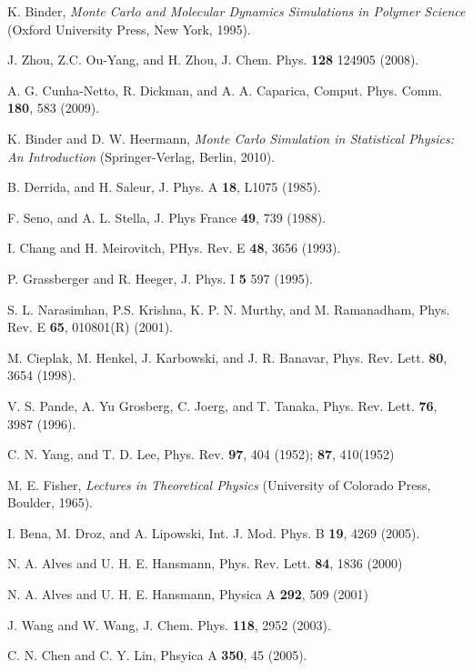 \documentclass[preprint,preprintnumbers,amsmath,amssymb,showpacs,aps,pre]{revtex4-1}
\begin{document}
\begin{thebibliography}{10}
K. Binder, {\it Monte Carlo and Molecular Dynamics Simulations in
Polymer Science} (Oxford University Press, New York, 1995).

J. Zhou, Z.C. Ou-Yang, and H. Zhou, J. Chem. Phys. {\bf 128}
124905 (2008).

A. G. Cunha-Netto, R. Dickman, and A. A. Caparica, Comput. Phys. Comm.
{\bf 180}, 583 (2009).

K. Binder and D. W. Heermann, {\it Monte Carlo Simulation in
Statistical Physics: An Introduction} (Springer-Verlag, Berlin, 2010).

B. Derrida, and H. Saleur, J. Phys. A {\bf 18}, L1075 (1985).

F. Seno, and A. L. Stella, J. Phys France {\bf 49}, 739 (1988).

I. Chang and H. Meirovitch, PHys. Rev. E {\bf 48}, 3656 (1993).

P. Grassberger and R. Heeger, J. Phys. I {\bf 5} 597 (1995).

S. L. Narasimhan, P.S. Krishna, K. P. N. Murthy, and M. Ramanadham,
Phys. Rev. E {\bf 65}, 010801(R) (2001).

M. Cieplak, M. Henkel, J. Karbowski, and J. R. Banavar,
Phys. Rev. Lett. {\bf 80}, 3654 (1998).

V. S. Pande, A. Yu Grosberg, C. Joerg, and T. Tanaka,
Phys. Rev. Lett. {\bf 76}, 3987 (1996).

C. N. Yang, and T. D. Lee, Phys. Rev. {\bf 97}, 404 (1952); 
{\bf 87}, 410(1952)

M. E. Fisher, {\it Lectures in Theoretical Physics} (University of Colorado
Press, Boulder, 1965).

I. Bena, M. Droz, and A. Lipowski, Int. J. Mod. Phys. B {\bf 19},
4269 (2005).

N. A. Alves and U. H. E. Hansmann, Phys. Rev. Lett. {\bf 84}, 1836 (2000)

N. A. Alves and U. H. E. Hansmann, Physica A {\bf 292}, 509 (2001)

J. Wang and W. Wang, J. Chem. Phys. {\bf 118}, 2952 (2003).

C. N. Chen and C. Y. Lin, Phsyica A {\bf 350}, 45 (2005).

\end{thebibliography}
\end{document}

